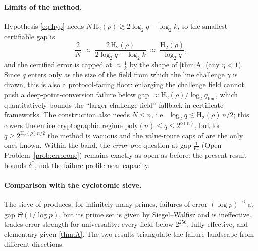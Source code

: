 \documentclass[11pt]{article}
\theoremstyle{definition}
\theoremstyle{remark}
\newcommand{\Hb}{\mathrm{H}_2}
\begin{document}
\paragraph{Limits of the method.}
Hypothesis \eqref{eq:hyp} needs $N\,\Hb(\rho)\gtrsim2\log_2q-\log_2k$, so the smallest certifiable gap is
\[
\frac2N\;\approx\;\frac{2\,\Hb(\rho)}{2\log_2q-\log_2k}\;\approx\;\frac{\Hb(\rho)}{\log_2 q},
\]
and the certified error is capped at $\approx\frac1k$ by the shape of \cref{thm:A} (any $\eta<1$). Since $q$ enters only as the size of the field from which the line challenge $\gamma$ is drawn, this is also a protocol-facing floor: enlarging the challenge field cannot push a deep-point-conversion failure below gap $\approx\Hb(\rho)/\log_2 q_{\mathrm{line}}$, which quantitatively bounds the ``larger challenge field'' fallback in certificate frameworks. The construction also needs $N\le n$, i.e.\ $\log_2q\lesssim\Hb(\rho)\,n/2$; this covers the entire cryptographic regime $\mathrm{poly}(n)\le q\le2^{o(n)}$, but for $q\ge2^{\Hb(\rho)n/2}$ the method is vacuous and the value-route caps of \cite{Cho26a,Cho26b} are the only ones known. Within the band, the \emph{error-one} question at gap $\frac1{64}$ (Open Problem~\ref{prob:errorone}) remains exactly as open as before: the present result bounds $\delta^*$, not the failure profile near capacity.

\paragraph{Comparison with the cyclotomic sieve.}
The sieve of \cite{Cho26a} produces, for infinitely many primes, failures of error $(\log p)^{-6}$ at gap $\Theta(1/\log p)$, but its prime set is given by Siegel--Walfisz and is ineffective.  trades error strength for universality: every field below $2^{256}$, fully effective, and elementary given \cref{thm:A}. The two results triangulate the failure landscape from different directions.
\end{document}
